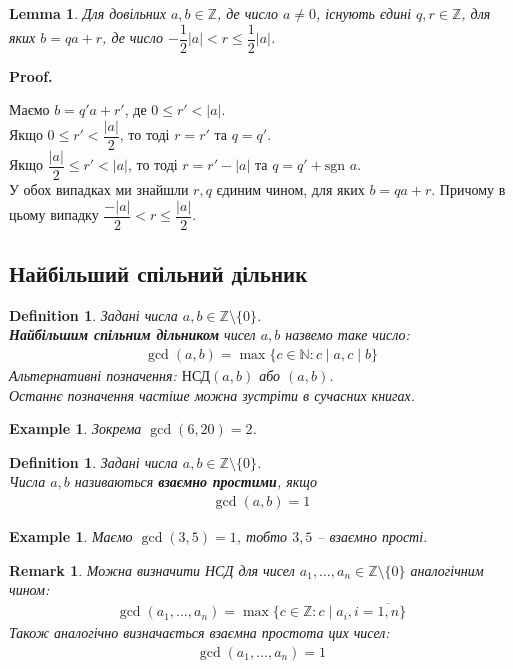 \documentclass[a4paper, 14pt]{extarticle}
\makeatletter
\theoremstyle{theoremdd}
\theoremstyle{theoremdd}
\newtheorem{definition}[theorem]{Definition}
\theoremstyle{theoremdd}
\theoremstyle{theoremdd}
\newtheorem{example}[theorem]{Example}
\theoremstyle{theoremdd}
\theoremstyle{theoremdd}
\newtheorem{remark}[theorem]{Remark}
\theoremstyle{theoremdd}
\newtheorem{lemma}[theorem]{Lemma}
\theoremstyle{theoremdd}
\def\qed{$\blacksquare$}
\renewenvironment{proof}[1][Proof.\\]{\par
\pushQED{\hfill \qed}%
\normalfont \topsep6\p@\@plus6\p@\relax
\trivlist
\item\relax
{\bfseries
#1\@addpunct{.}}\hspace\labelsep\ignorespaces
}{%
\popQED\endtrivlist\@endpefalse
}
\makeatother
\begin{document}
\begin{lemma}
Для довільних $a,b \in \mathbb{Z}$, де число $a \neq 0$, існують єдині $q,r \in \mathbb{Z}$, для яких $b = qa+r$, де число $-\dfrac{1}{2}|a| < r \leq \dfrac{1}{2}|a|$.
\end{lemma}

\begin{proof}
Маємо $b = q'a+r'$, де $0 \leq r' < |a|$.\\
Якщо $0 \leq r' < \dfrac{|a|}{2}$, то тоді $r = r'$ та $q = q'$.\\
Якщо $\dfrac{|a|}{2} \leq r' < |a|$, то тоді $r = r' - |a|$ та $q = q'+\text{sgn } a$.\\
У обох випадках ми знайшли $r,q$ єдиним чином, для яких $b = qa+r$. Причому в цьому випадку $\dfrac{-|a|}{2} < r \leq \dfrac{|a|}{2}$.
\end{proof}

\subsection{Найбільший спільний дільник}
\begin{definition}
Задані числа $a,b \in \mathbb{Z} \setminus \{0\}$.\\
\textbf{Найбільшим спільним дільником} чисел $a,b$ назвемо таке число:
\begin{align*}
\gcd(a,b) = \max\{c \in \mathbb{N}: c \mid a, c \mid b\}
\end{align*}
Альтернативні позначення: $\text{НСД}(a,b)$ або $(a,b)$. \\
Останнє позначення частіше можна зустріти в сучасних книгах.
\end{definition}

\begin{example}
Зокрема $\gcd(6,20) = 2$.
\end{example}

\begin{definition}
Задані числа $a,b \in \mathbb{Z} \setminus \{0\}$.\\
Числа $a,b$ називаються \textbf{взаємно простими}, якщо
\begin{align*}
\gcd(a,b) = 1
\end{align*}
\end{definition}

\begin{example}
Маємо $\gcd(3,5) = 1$, тобто $3,5$ -- взаємно прості.
\end{example}

\begin{remark}
Можна визначити НСД для чисел $a_1,\dots,a_n \in \mathbb{Z} \setminus \{0\}$ аналогічним чином:
\begin{align*}
\gcd(a_1,\dots,a_n) = \max\{c \in \mathbb{Z}: c \mid a_i, i = \overline{1,n}\}
\end{align*}
Також аналогічно визначається взаємна простота цих чисел:
\begin{align*}
\gcd(a_1,\dots,a_n) = 1
\end{align*}
\end{remark}
\end{document}
